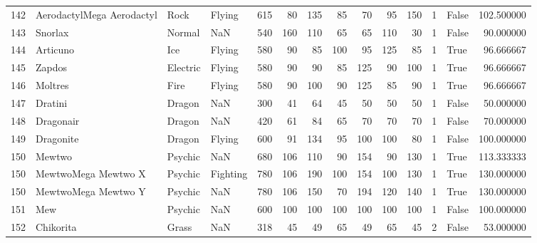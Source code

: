 \begin{tabular}{rlllrrrrrrrrlr}
 142 &  AerodactylMega Aerodactyl &      Rock &    Flying &    615 &   80 &     135 &       85 &       70 &       95 &    150 &           1 &      False &  102.500000 \\
 143 &                    Snorlax &    Normal &       NaN &    540 &  160 &     110 &       65 &       65 &      110 &     30 &           1 &      False &   90.000000 \\
 144 &                   Articuno &       Ice &    Flying &    580 &   90 &      85 &      100 &       95 &      125 &     85 &           1 &       True &   96.666667 \\
 145 &                     Zapdos &  Electric &    Flying &    580 &   90 &      90 &       85 &      125 &       90 &    100 &           1 &       True &   96.666667 \\
 146 &                    Moltres &      Fire &    Flying &    580 &   90 &     100 &       90 &      125 &       85 &     90 &           1 &       True &   96.666667 \\
 147 &                    Dratini &    Dragon &       NaN &    300 &   41 &      64 &       45 &       50 &       50 &     50 &           1 &      False &   50.000000 \\
 148 &                  Dragonair &    Dragon &       NaN &    420 &   61 &      84 &       65 &       70 &       70 &     70 &           1 &      False &   70.000000 \\
 149 &                  Dragonite &    Dragon &    Flying &    600 &   91 &     134 &       95 &      100 &      100 &     80 &           1 &      False &  100.000000 \\
 150 &                     Mewtwo &   Psychic &       NaN &    680 &  106 &     110 &       90 &      154 &       90 &    130 &           1 &       True &  113.333333 \\
 150 &        MewtwoMega Mewtwo X &   Psychic &  Fighting &    780 &  106 &     190 &      100 &      154 &      100 &    130 &           1 &       True &  130.000000 \\
 150 &        MewtwoMega Mewtwo Y &   Psychic &       NaN &    780 &  106 &     150 &       70 &      194 &      120 &    140 &           1 &       True &  130.000000 \\
 151 &                        Mew &   Psychic &       NaN &    600 &  100 &     100 &      100 &      100 &      100 &    100 &           1 &      False &  100.000000 \\
 152 &                  Chikorita &     Grass &       NaN &    318 &   45 &      49 &       65 &       49 &       65 &     45 &           2 &      False &   53.000000 \\

\end{tabular}
